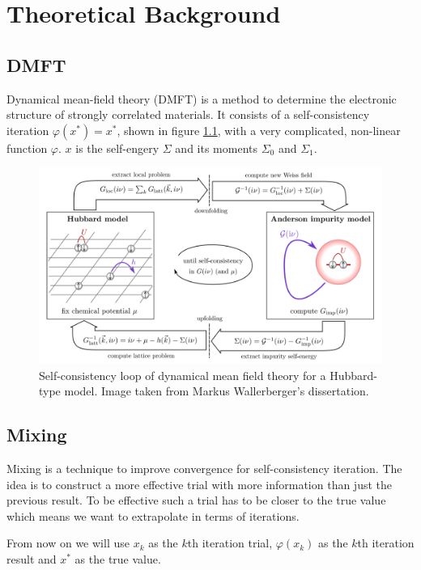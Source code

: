 \chapter{Theoretical Background}
\label{ch:background}

\section{DMFT}

Dynamical mean-field theory (DMFT) is a method to determine the electronic structure of strongly correlated materials. It consists of a self-consistency iteration \(\varphi(x^\ast) = x^\ast\), shown in figure \ref{fig:dmft}, with a very complicated, non-linear function \(\varphi\). $x$ is the self-engery $\Sigma$ and its moments $\Sigma_0$ and $\Sigma_1$.

\begin{figure}[H]
    \centering
    \includegraphics[width=1.0\textwidth]{figures/dmft.png}
    \caption{Self-consistency loop of dynamical mean field theory for a Hubbard-type model. Image taken from Markus Wallerberger's dissertation.}
    \label{fig:dmft}
\end{figure}

\section{Mixing}
Mixing is a technique to improve convergence for self-consistency iteration. The idea is to construct a more effective trial with more information than just the previous result. To be effective such a trial has to be closer to the true value which means we want to extrapolate in terms of iterations.

From now on we will use $x_k$ as the $k$th iteration trial, $\varphi(x_k)$ as the $k$th iteration result and $x^\ast$ as the true value.

